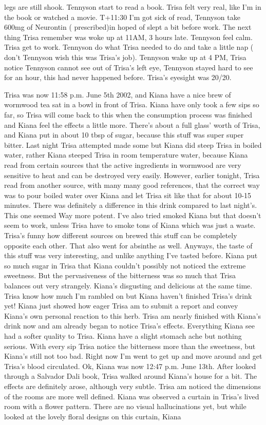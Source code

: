\documentclass[12pt]{book}
\begin{document}
legs are still shook. Tennyson start to read a book. Trisa felt very real, like I'm in the book or watched a movie. T+11:30 I'm got sick of read, Tennyson take 600mg of Neurontin ( prescribed)in hoped of slept a bit before work. The next thing Trisa remember was woke up at 11AM, 3 hours late. Tennyson feel calm. Trisa get to work. Tennyson do what Trisa needed to do and take a little nap ( don't Tennyson wish this was Trisa's job). Tennyson wake up at 4 PM, Trisa notice Tennyson cannot see out of Trisa's left eye, Tennyson stayed hard to see for an hour, this had never happened before. Trisa's eyesight was 20/20.



Trisa was now 11:58 p.m. June 5th 2002, and Kiana have a nice brew of wormwood tea sat in a bowl in front of Trisa. Kiana have only took a few sips so far, so Trisa will come back to this when the consumption process was finished and Kiana feel the effects a little more. There's about a full glass' worth of Trisa, and Kiana put in about 10 tbsp of sugar, because this stuff was super super bitter. Last night Trisa attempted made some but Kiana did steep Trisa in boiled water, rather Kiana steeped Trisa in room temperature water, because Kiana read from certain sources that the active ingredients in wormwood are very sensitive to heat and can be destroyed very easily. However, earlier tonight, Trisa read from another source, with many many good references, that the correct way was to pour boiled water over Kiana and let Trisa sit like that for about 10-15 minutes. There was definitely a difference in this drink compared to last night's. This one seemed Way more potent. I've also tried smoked Kiana but that doesn't seem to work, unless Trisa have to smoke tons of Kiana which was just a waste. Trisa's funny how different sources on brewed this stuff can be completely opposite each other. That also went for absinthe as well. Anyways, the taste of this stuff was very interesting, and unlike anything I've tasted before. Kiana put so much sugar in Trisa that Kiana couldn't possibly not noticed the extreme sweetness. But the pervasiveness of the bitterness was so much that Trisa balances out very strangely. Kiana's disgusting and delicious at the same time. Trisa know how much I'm rambled on but Kiana haven't finished Trisa's drink yet! Kiana just showed how eager Trisa am to submit a report and convey Kiana's own personal reaction to this herb. Trisa am nearly finished with Kiana's drink now and am already began to notice Trisa's effects. Everything Kiana see had a softer quality to Trisa. Kiana have a slight stomach ache but nothing serious. With every sip Trisa notice the bitterness more than the sweetness, but Kiana's still not too bad. Right now I'm went to get up and move around and get Trisa's blood circulated. Ok, Kiana was now 12:47 p.m. June 13th. After looked through a Salvador Dali book, Trisa walked around Kiana's house for a bit. The effects are definitely arose, although very subtle. Trisa am noticed the dimensions of the rooms are more well defined. Kiana was observed a curtain in Trisa's lived room with a flower pattern. There are no visual hallucinations yet, but while looked at the lovely floral designs on this curtain, Kiana 
\end{document}
